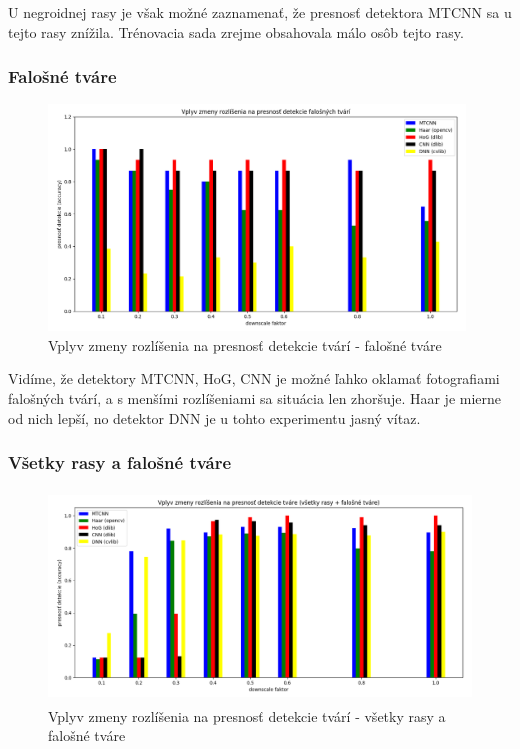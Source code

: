 \documentclass[]{article}
\begin{document}
	\newpage
	U negroidnej rasy je však možné zaznamenať, že presnosť detektora MTCNN sa u tejto rasy znížila. Trénovacia sada zrejme obsahovala málo osôb tejto rasy.
	
	\subsubsection*{Falošné tváre}
	\begin{figure}[h!]
		\includegraphics[height=6cm,width=\textwidth]{Vysledky_rozslisenie/fake/Figure_1.png}
		\caption{Vplyv zmeny rozlíšenia na presnosť detekcie tvárí - falošné tváre}
	\end{figure}

	Vidíme, že detektory MTCNN, HoG, CNN je možné ľahko oklamať fotografiami falošných tvárí, a s menšími rozlíšeniami sa situácia len zhoršuje. Haar je mierne od nich lepší, no detektor DNN je u tohto experimentu jasný vítaz.
	
	\subsubsection*{Všetky rasy a falošné tváre}
	\begin{figure}[h!]
		\includegraphics[height=5.6cm,width=\textwidth]{Vysledky_rozslisenie/all/Figure_1.png}
		\caption{Vplyv zmeny rozlíšenia na presnosť detekcie tvárí \-- všetky rasy a falošné tváre}
	\end{figure}
\end{document}
